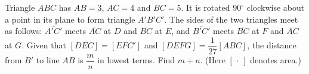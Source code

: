 Triangle $ABC$ has $AB=3$, $AC=4$ and $BC=5$. It is rotated $90^\circ$ clockwise about a point in its plane to form triangle $A'B'C'$. The sides of the two triangles meet as follows: $\overline{A'C'}$ meets $\overline{AC}$ at $D$ and $\overline{BC}$ at $E$, and $\overline{B'C'}$ meets $\overline{BC}$ at $F$ and $\overline{AC}$ at $G$. Given that $[DEC]=[EFC']$ and $[DEFG]=\dfrac1{27}[ABC]$, the distance from $B'$ to line $AB$ is $\dfrac mn$ in lowest terms. Find $m+n$. (Here $[\,\cdot\,]$ denotes area.)
